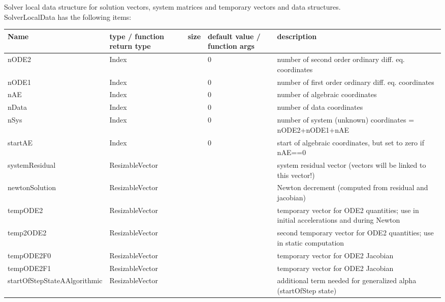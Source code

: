  \label{sec:SolverLocalData}
Solver local data structure for solution vectors, system matrices and temporary vectors and data structures.\\ 
%
SolverLocalData has the following items:
\begin{center}
  \footnotesize
  \begin{longtable}{| p{4.2cm} | p{2.5cm} | p{0.3cm} | p{3.0cm} | p{6cm} |}
    \hline
    \bf Name & \bf type / function return type & \bf size & \bf default value / function args & \bf description \\ \hline
    nODE2 &     Index &      &     0 &     number of second order ordinary diff. eq. coordinates\\ \hline
    nODE1 &     Index &      &     0 &     number of first order ordinary diff. eq. coordinates\\ \hline
    nAE &     Index &      &     0 &     number of algebraic coordinates\\ \hline
    nData &     Index &      &     0 &     number of data coordinates\\ \hline
    nSys &     Index &      &     0 &     number of system (unknown) coordinates = nODE2+nODE1+nAE\\ \hline
    startAE &     Index &      &     0 &     start of algebraic coordinates, but set to zero if nAE==0\\ \hline
    systemResidual &     ResizableVector &      &      &     system residual vector (vectors will be linked to this vector!)\\ \hline
    newtonSolution &     ResizableVector &      &      &     Newton decrement (computed from residual and jacobian)\\ \hline
    tempODE2 &     ResizableVector &      &      &     temporary vector for ODE2 quantities; use in initial accelerations and during Newton\\ \hline
    temp2ODE2 &     ResizableVector &      &      &     second temporary vector for ODE2 quantities; use in static computation\\ \hline
    tempODE2F0 &     ResizableVector &      &      &     temporary vector for ODE2 Jacobian\\ \hline
    tempODE2F1 &     ResizableVector &      &      &     temporary vector for ODE2 Jacobian\\ \hline
    startOfStepStateAAlgorithmic &     ResizableVector &      &      &     additional term needed for generalized alpha (startOfStep state)\\ \hline

\end{longtable}
\end{center}
